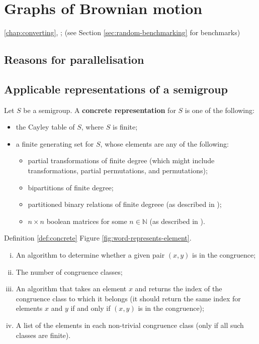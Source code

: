 \chapter{Graphs of Brownian motion}
\label{chap:graphs}

 \ref{chap:converting},
 \cite[\S 5.3]{howie};  (see Section
\ref{sec:random-benchmarking} for benchmarks)

\section{Reasons for parallelisation}


\section{Applicable representations of a semigroup}
\label{sec:applicable-representations-of-a-semigroup}


\begin{definition}
  \label{def:concrete}
  Let $S$ be a semigroup.
  A \textbf{concrete representation} for $S$ is one of the following:
  \begin{itemize}
  \item the Cayley table of $S$, where $S$ is finite;
  \item a finite generating set for $S$, whose elements are any of the
    following:
    \begin{itemize}
    \item partial transformations of finite degree (which might include
      transformations, partial permutations, and permutations);
    \item bipartitions of finite degree;
    \item partitioned binary relations of finite degreee (as described in
      \cite[\S2.1]{diagram_semigroups});
    \item $n \times n$ boolean matrices for some $n \in \mathbb{N}$ (as
      described in \cite{boolmat}).
    \end{itemize}
  \end{itemize}
\end{definition}

 Definition \ref{def:concrete}
 Figure \ref{fig:word-represents-element}. 
 
\begin{enumerate}[(i)]
\item An algorithm to determine whether a given pair $(x,y)$ is in the
  congruence;
\item The number of congruence classes;
\item An algorithm that takes an element $x$ and returns the index of the
  congruence class to which it belongs (it should return the same index for
  elements $x$ and $y$ if and only if $(x,y)$ is in the congruence);
\item A list of the elements in each non-trivial congruence class (only if
  all such classes are finite).
\end{enumerate}



